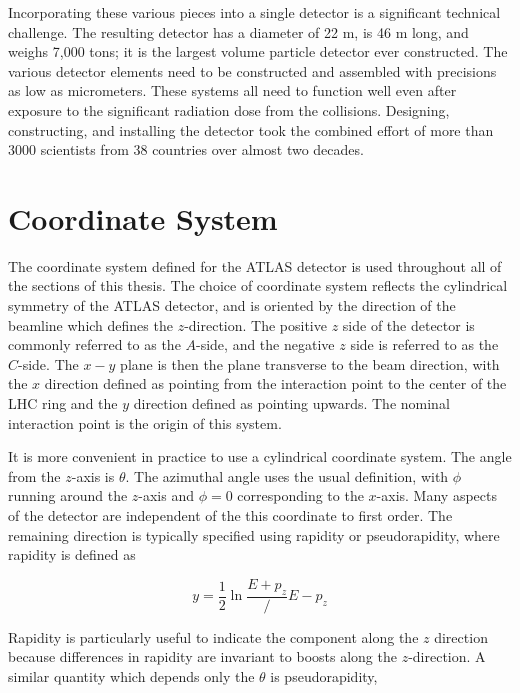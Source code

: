 Incorporating these various pieces into a single detector is a significant technical challenge.
The resulting detector has a diameter of 22 m, is 46 m long, and weighs 7,000 tons; it is the largest volume particle detector ever constructed.
The various detector elements need to be constructed and assembled with precisions as low as micrometers.
These systems all need to function well even after exposure to the significant radiation dose from the collisions.
Designing, constructing, and installing the detector took the combined effort of more than 3000 scientists from 38 countries over almost two decades.


\section{Coordinate System}

The coordinate system defined for the \ac{ATLAS} detector is used throughout all of the sections of this thesis.
The choice of coordinate system reflects the cylindrical symmetry of the \ac{ATLAS} detector, and is oriented by the direction of the beamline which defines the $z$-direction.
The positive $z$ side of the detector is commonly referred to as the $A$-side, and the negative $z$ side is referred to as the $C$-side.
The $x-y$ plane is then the plane transverse to the beam direction, with the $x$ direction defined as pointing from the interaction point to the center of the \ac{LHC} ring and the $y$ direction defined as pointing upwards.
The nominal interaction point is the origin of this system.

It is more convenient in practice to use a cylindrical coordinate system.
The angle from the $z$-axis is $\theta$.
The azimuthal angle uses the usual definition, with $\phi$ running around the $z$-axis and $\phi = 0$ corresponding to the $x$-axis.
Many aspects of the detector are independent of the this coordinate to first order.
The remaining direction is typically specified using rapidity or pseudorapidity, where rapidity is defined as

\begin{equation}\label{eq:rapidity}
y = \frac{1}{2} \ln \frac{E + p_z}/{E - p_z}
\end{equation}

\noindent Rapidity is particularly useful to indicate the component along the $z$ direction because differences in rapidity are invariant to boosts along the $z$-direction.
A similar quantity which depends only the $\theta$ is pseudorapidity, 

